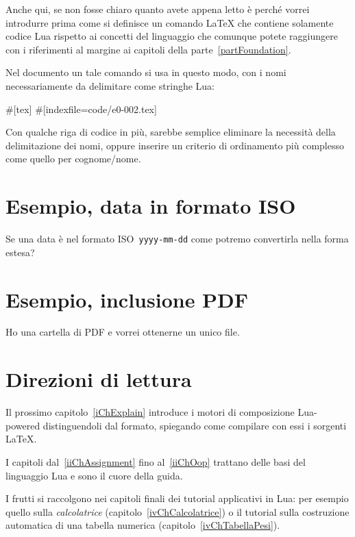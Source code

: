 Anche qui, se non fosse chiaro quanto avete appena letto è perché vorrei
introdurre prima come si definisce un comando \LaTeX{} che contiene solamente
codice Lua rispetto ai concetti del linguaggio che comunque potete raggiungere
con i riferimenti al margine ai capitoli della parte~\ref{partFoundation}.

Nel documento un tale comando si usa in questo modo, con i nomi necessariamente
da delimitare come stringhe Lua:
\begin{lines}
#[tex]
#[indexfile=code/e0-002.tex]
\end{lines}

Con qualche riga di codice in più, sarebbe semplice eliminare la necessità della
delimitazione dei nomi, oppure inserire un criterio di ordinamento più complesso
come quello per cognome/nome.


\section{Esempio, data in formato ISO}

Se una data è nel formato ISO~\texttt{yyyy-mm-dd} come potremo convertirla nella
forma estesa?


\section{Esempio, inclusione PDF}

Ho una cartella di PDF e vorrei ottenerne un unico file.


\section{Direzioni di lettura}

Il prossimo capitolo~\ref{iChExplain} introduce i motori di composizione
Lua-powered distinguendoli dal formato, spiegando come compilare con essi i
sorgenti \LaTeX{}.

I capitoli dal~\ref{iiChAssignment} fino al~\ref{iiChOop} trattano delle basi
del linguaggio Lua e sono il cuore della guida.


I frutti si raccolgono nei capitoli finali dei tutorial applicativi in Lua: per
esempio quello sulla \emph{calcolatrice} (capitolo~\ref{ivChCalcolatrice}) o il
tutorial sulla costruzione automatica di una tabella numerica
(capitolo~\ref{ivChTabellaPesi}).


